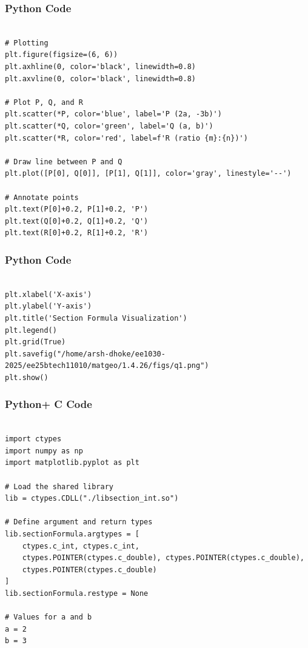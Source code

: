 \documentclass{beamer}
\begin{document}
\begin{frame}[fragile]
    \frametitle{Python Code}

    \begin{lstlisting}

# Plotting
plt.figure(figsize=(6, 6))
plt.axhline(0, color='black', linewidth=0.8)
plt.axvline(0, color='black', linewidth=0.8)

# Plot P, Q, and R
plt.scatter(*P, color='blue', label='P (2a, -3b)')
plt.scatter(*Q, color='green', label='Q (a, b)')
plt.scatter(*R, color='red', label=f'R (ratio {m}:{n})')

# Draw line between P and Q
plt.plot([P[0], Q[0]], [P[1], Q[1]], color='gray', linestyle='--')

# Annotate points
plt.text(P[0]+0.2, P[1]+0.2, 'P')
plt.text(Q[0]+0.2, Q[1]+0.2, 'Q')
plt.text(R[0]+0.2, R[1]+0.2, 'R')

\end{lstlisting}
\end{frame}


\begin{frame}[fragile]
    \frametitle{Python Code}

    \begin{lstlisting}

plt.xlabel('X-axis')
plt.ylabel('Y-axis')
plt.title('Section Formula Visualization')
plt.legend()
plt.grid(True)
plt.savefig("/home/arsh-dhoke/ee1030-2025/ee25btech11010/matgeo/1.4.26/figs/q1.png")
plt.show()

    \end{lstlisting}
\end{frame}

\begin{frame}[fragile]
    \frametitle{Python+ C Code}

    \begin{lstlisting}

import ctypes
import numpy as np
import matplotlib.pyplot as plt

# Load the shared library
lib = ctypes.CDLL("./libsection_int.so")

# Define argument and return types
lib.sectionFormula.argtypes = [
    ctypes.c_int, ctypes.c_int,
    ctypes.POINTER(ctypes.c_double), ctypes.POINTER(ctypes.c_double),
    ctypes.POINTER(ctypes.c_double)
]
lib.sectionFormula.restype = None

# Values for a and b
a = 2
b = 3


    \end{lstlisting}
\end{frame}
\end{document}
